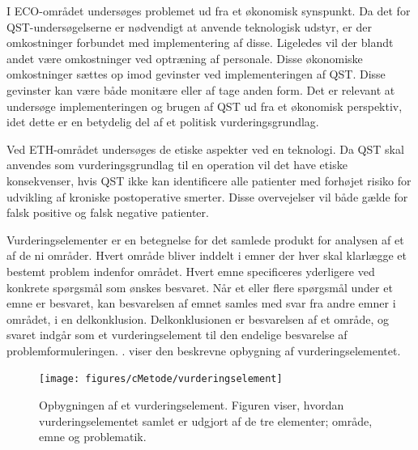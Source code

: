 I ECO-området undersøges problemet ud fra et økonomisk synspunkt. Da det for QST-undersøgelserne er nødvendigt at anvende teknologisk udstyr, er der omkostninger forbundet med implementering af disse. Ligeledes vil der blandt andet være omkostninger ved optræning af personale. Disse økonomiske omkostninger sættes op imod gevinster ved implementeringen af QST. Disse gevinster kan være både monitære eller af tage anden form. Det er relevant at undersøge implementeringen og brugen af QST ud fra et økonomisk perspektiv, idet dette er en betydelig del af et politisk vurderingsgrundlag. 

Ved ETH-området undersøges de etiske aspekter ved en teknologi. Da QST skal anvendes som vurderingsgrundlag til en operation vil det have etiske konsekvenser, hvis QST ikke kan identificere alle patienter med forhøjet risiko for udvikling af kroniske postoperative smerter. Disse overvejelser vil både gælde for falsk positive og falsk negative patienter.        


	
Vurderingselementer er en betegnelse for det samlede produkt for analysen af et af de ni områder. Hvert område bliver inddelt i emner der hver skal klarlægge et bestemt problem indenfor området. Hvert emne specificeres yderligere ved konkrete spørgsmål som ønskes besvaret. Når et eller flere spørgsmål under et emne er besvaret, kan besvarelsen af emnet samles med svar fra andre emner i området, i en delkonklusion. Delkonklusionen er besvarelsen af et område, og svaret indgår som et vurderingselement til den endelige besvarelse af problemformuleringen.  \citep{HTAcore}.  viser den beskrevne opbygning af vurderingselementet. 


\begin{figure}[H] 
\begin{center}
\texttt{[image: figures/cMetode/vurderingselement]}
\end{center}
\caption{Opbygningen af et vurderingselement. Figuren viser, hvordan vurderingselementet samlet er udgjort af de tre elementer; område, emne og problematik.}
\label{fig:vurderingselement} 
\end{figure}

